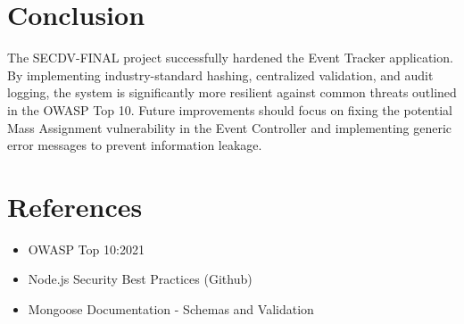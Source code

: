 \documentclass[11pt]{article}
\begin{document}
\section{Conclusion}
The SECDV-FINAL project successfully hardened the Event Tracker application. By implementing industry-standard hashing, centralized validation, and audit logging, the system is significantly more resilient against common threats outlined in the OWASP Top 10. Future improvements should focus on fixing the potential Mass Assignment vulnerability in the Event Controller and implementing generic error messages to prevent information leakage.

\section{References}
\begin{itemize}
    \item OWASP Top 10:2021
    \item Node.js Security Best Practices (Github)
    \item Mongoose Documentation - Schemas and Validation
\end{itemize}
\end{document}
